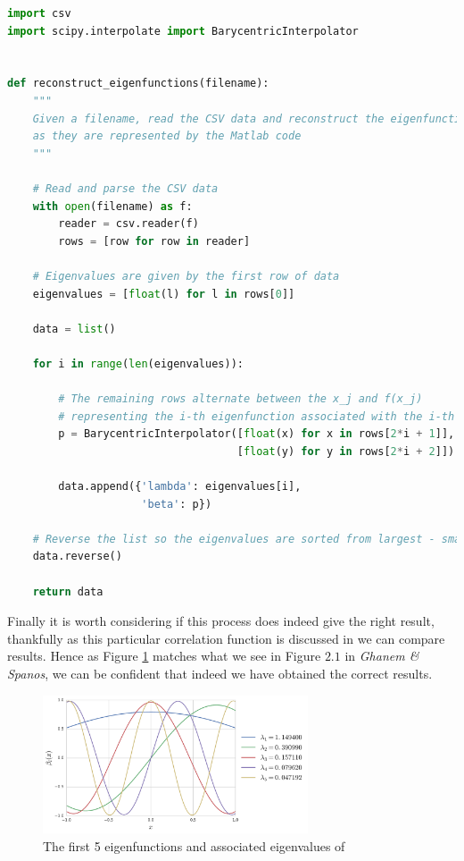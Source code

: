 \begin{lstlisting}[caption={Python code which reconstructs the eigenfunctions
                            we found using Matlab},
                   label={code:python-reconstruct-eigen},
                   language=Python]
import csv
import scipy.interpolate import BarycentricInterpolator


def reconstruct_eigenfunctions(filename):
    """
    Given a filename, read the CSV data and reconstruct the eigenfunctions
    as they are represented by the Matlab code
    """

    # Read and parse the CSV data
    with open(filename) as f:
        reader = csv.reader(f)
        rows = [row for row in reader]

    # Eigenvalues are given by the first row of data
    eigenvalues = [float(l) for l in rows[0]]

    data = list()

    for i in range(len(eigenvalues)):

        # The remaining rows alternate between the x_j and f(x_j)
        # representing the i-th eigenfunction associated with the i-th eigenvalue
        p = BarycentricInterpolator([float(x) for x in rows[2*i + 1]],
                                    [float(y) for y in rows[2*i + 2]])

        data.append({'lambda': eigenvalues[i],
                     'beta': p})

    # Reverse the list so the eigenvalues are sorted from largest - smallest
    data.reverse()

    return data
\end{lstlisting}

Finally it is worth considering if this process does indeed give the right
result, thankfully as this particular correlation function
 is discussed in
\cite{stochastic-fem} we can compare results. Hence as Figure
\ref{fig:kle-eigenfunctions} matches what we see in Figure $2.1$ in
\textit{Ghanem \& Spanos}, we can be confident that indeed we have obtained the
correct results.

\begin{figure}
    \centering
    \includegraphics[width=0.7\textwidth]{img/kle-eigenfunctions.pdf}
    \caption{The first 5 eigenfunctions and associated eigenvalues of
             }
    \label{fig:kle-eigenfunctions}
\end{figure}

